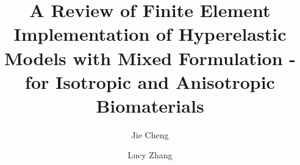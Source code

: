 \documentclass[preprint,11pt]{elsarticle}
\begin{document}
\small

\begin{frontmatter}
\title{A Review of Finite Element Implementation of Hyperelastic Models with Mixed Formulation - for Isotropic and Anisotropic  Biomaterials}

\author{Jie Cheng}

\author{Lucy Zhang}


\address{Department of Mechanical Aerospace and Nuclear Engineering, Rensselaer Polytechnic Institute, Troy, NY 12180, USA}



\end{frontmatter}


\tableofcontents









\clearpage



\end{document}

